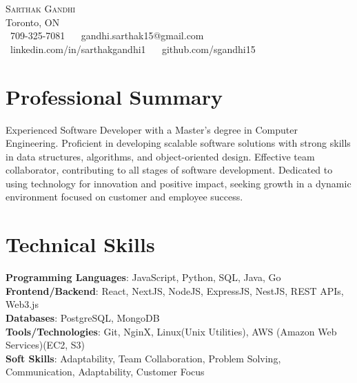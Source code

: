 \documentclass[letterpaper,11pt]{article}
\begin{document}
\begin{center}
    {\Huge \scshape Sarthak Gandhi} \\ \vspace{1pt}
    Toronto, ON \\ \vspace{1pt}
    \small \raisebox{-0.1\height}\faPhone\ 709-325-7081 ~ 
    {\raisebox{-0.2\height}\faEnvelope\  {gandhi.sarthak15@gmail.com}} ~ 
    {\raisebox{-0.2\height}\faLinkedin\ {linkedin.com/in/sarthakgandhi1}}  ~
    {\raisebox{-0.2\height}\faGithub\ {github.com/sgandhi15}}
    \vspace{-8pt}
\end{center}


\section{Professional Summary}
Experienced Software Developer with a Master's degree in Computer Engineering. Proficient in developing scalable software solutions with strong skills in data structures, algorithms, and object-oriented design. Effective team collaborator, contributing to all stages of software development. Dedicated to using technology for innovation and positive impact, seeking growth in a dynamic environment focused on customer and employee success.
\vspace{-8pt}

\section{Technical Skills}
\begin{itemize}[leftmargin=0.15in, label={}]
\small{\item{
\textbf{Programming Languages}{: JavaScript, Python, SQL, Java, Go} \\
\textbf{Frontend/Backend}{: React, NextJS, NodeJS, ExpressJS, NestJS, REST APIs, Web3.js} \\
\textbf{Databases}{: PostgreSQL, MongoDB} \\
\textbf{Tools/Technologies}{: Git, NginX, Linux(Unix Utilities), AWS (Amazon Web Services)(EC2, S3)} \\
\textbf{Soft Skills}{: Adaptability, Team Collaboration, Problem Solving, Communication, Adaptability, Customer Focus} \\
}}
\end{itemize}
\vspace{-16pt}
\end{document}
